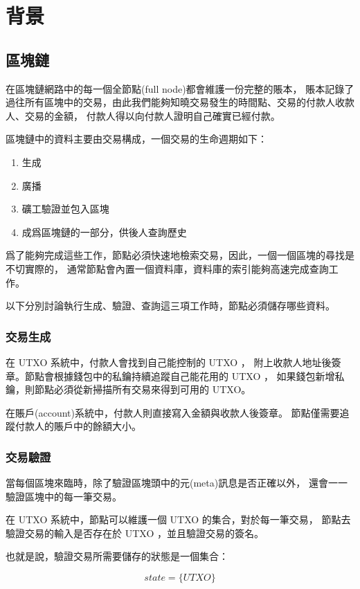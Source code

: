 \chapter{背景}
\label{c:background}

\section{區塊鏈}
在區塊鏈網路中的每一個全節點(full node)都會維護一份完整的賬本，
賬本記錄了過往所有區塊中的交易，由此我們能夠知曉交易發生的時間點、交易的付款人收款人、交易的金額，
付款人得以向付款人證明自己確實已經付款。

區塊鏈中的資料主要由交易構成，一個交易的生命週期如下：

\begin{enumerate}
  \item 生成
  \item 廣播
  \item 礦工驗證並包入區塊
  \item 成爲區塊鏈的一部分，供後人查詢歷史
\end{enumerate}

爲了能夠完成這些工作，節點必須快速地檢索交易，因此，一個一個區塊的尋找是不切實際的， 
通常節點會內置一個資料庫，資料庫的索引能夠高速完成查詢工作。

以下分別討論執行生成、驗證、查詢這三項工作時，節點必須儲存哪些資料。

\subsection{交易生成}
在 UTXO 系統中，付款人會找到自己能控制的 UTXO ，
附上收款人地址後簽章。節點會根據錢包中的私鑰持續追蹤自己能花用的 UTXO ，
如果錢包新增私鑰，則節點必須從新掃描所有交易來得到可用的 UTXO。

在賬戶(account)系統中，付款人則直接寫入金額與收款人後簽章。
節點僅需要追蹤付款人的賬戶中的餘額大小。

\subsection{交易驗證}
當每個區塊來臨時，除了驗證區塊頭中的元(meta)訊息是否正確以外，
還會一一驗證區塊中的每一筆交易。

在 UTXO 系統中，節點可以維護一個 UTXO 的集合，對於每一筆交易，
節點去驗證交易的輸入是否存在於 UTXO ，並且驗證交易的簽名。

也就是說，驗證交易所需要儲存的狀態是一個集合：

\[state = \{UTXO\}\]

